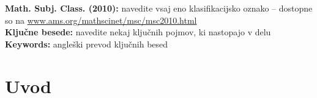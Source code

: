 \documentclass[12pt,a4paper]{amsart}
\theoremstyle{definition} %
\theoremstyle{plain} %
\begin{document}
\vfill\noindent
{\bf Math. Subj. Class. (2010):} navedite vsaj eno klasifikacijsko oznako -- dostopne so na \url{www.ams.org/mathscinet/msc/msc2010.html}  \\[1mm]  
{\bf Ključne besede:} navedite nekaj ključnih pojmov, ki nastopajo v delu  \\[1mm]  
{\bf Keywords:} angleški prevod ključnih besed
\pagebreak

\section{Uvod}

\end{document}
